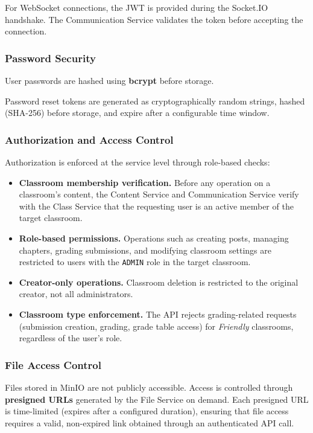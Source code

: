 For WebSocket connections, the JWT is provided during the Socket.IO handshake.
The Communication Service validates the token before accepting the connection.

\subsubsection{Password Security}

User passwords are hashed using \textbf{bcrypt} before storage.

Password reset tokens are generated as cryptographically random strings, hashed (SHA-256) before storage, and expire after a configurable time window.

\subsubsection{Authorization and Access Control}

Authorization is enforced at the service level through role-based checks:

\begin{itemize}[nosep]
  \item \textbf{Classroom membership verification.}
        Before any operation on a classroom's content, the Content Service and Communication Service verify with the Class Service that the requesting user is an active member of the target classroom.
  \item \textbf{Role-based permissions.}
        Operations such as creating posts, managing chapters, grading submissions, and modifying classroom settings are restricted to users with the \texttt{ADMIN} role in the target classroom.
  \item \textbf{Creator-only operations.}
        Classroom deletion is restricted to the original creator, not all administrators.
  \item \textbf{Classroom type enforcement.}
        The API rejects grading-related requests (submission creation, grading, grade table access) for \emph{Friendly} classrooms, regardless of the user's role.
\end{itemize}

\subsubsection{File Access Control}

Files stored in MinIO are not publicly accessible.
Access is controlled through \textbf{presigned URLs} generated by the File Service on demand.
Each presigned URL is time-limited (expires after a configured duration), ensuring that file access requires a valid, non-expired link obtained through an authenticated API call.

